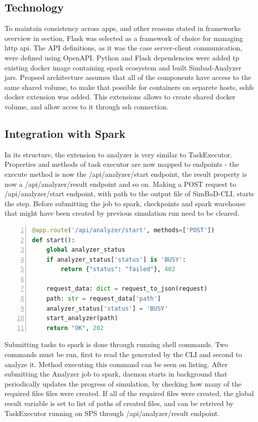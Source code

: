 \subsection{Technology}
To maintain consistency across apps, and other reasons stated in frameworks overview in section, Flask was selected as a framework of choice for managing http api. The API definitions, as it was the case server-client communication, were defined using OpenAPI. Python and Flask dependencies were added tp existing docker image containing spark ecosystem and built Simbad-Analyzer jars. Propsed architecture assumes that all of the components have access to the same shared volume, to make that possible for containers on separete hosts, sshfs docker extension was added. This extensions allows to create shared docker volume, and allow acces to it through ssh connection.
\subsection{Integration with Spark}
In its structure, the extension to analyzer is very similar to TaskExecutor. Properties and methods of task executor are now mapped to endpoints - the execute method is now the /api/analyzer/start endpoint, the result property is now a /api/analyzer/result endpoint and so on. Making a POST request to /api/analyzer/start endpoint, with path to the output file of SimBaD-CLI, starts the step. Before submitting the job to spark, checkpoints and spark warehouse that might have been created by previous simulation run need to be cleared.
\begin{lstlisting}[label=list:sp-exec-local-use,caption=Use of LocalExecutor for SimBaD-CLI step, basicstyle=\footnotesize\ttfamily, language=python, numbers=left]
@app.route('/api/analyzer/start', methods=['POST'])
def start():
    global analyzer_status
    if analyzer_status['status'] is 'BUSY':
        return {"status": "failed"}, 402
        
    request_data: dict = request_to_json(request)
    path: str = request_data['path']
    analyzer_status['status'] = 'BUSY'
    start_analyzer(path)
    return "OK", 202
\end{lstlisting}
Submitting tasks to spark is done through running shell commands. Two commands must be run, first to read the generated by the CLI and second to analyze it. Method executing this command can be seen on listing. After submitting the Analyzer job to spark, daemon starts in background that periodically updates the progress of simulation, by checking how many of the required files files were created. If all of the required files were created, the global result variable is set to list of paths of created files, and can be retrived by TaskExecutor running on SPS through /api/analyzer/result endpoint.
